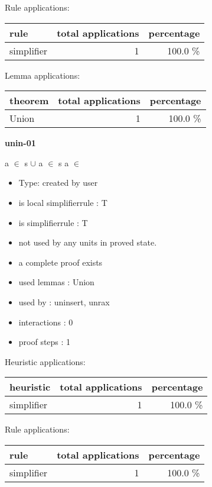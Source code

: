 \documentclass[a4paper]{article}
\begin{document}
Rule applications:

\begin{supertabular}{l|r|r}
rule	        & total applications & percentage \\ \hline
simplifier & 1 & 100.0 \% \\

\end{supertabular}

Lemma applications:

\begin{supertabular}{l|r|r}
theorem	        & total applications & percentage \\ \hline
Union & 1 & 100.0 \% \\

\end{supertabular}
\pagebreak

{\LARGE\bf unin-01}\label{lemma-unin-01}

\medskip

 \Fol \Not a $\in$ s $\cup$  \Equiv \Not a $\in$ s \And \Not a $\in$ 

\begin{itemize}

\item Type: created by user

\item is local simplifierrule : T
\item is simplifierrule : T
\item not used by any units in proved state.
\item       a complete proof exists
\item       used lemmas  : Union
\item       used by      : uninsert, unrax
\item       interactions : 0
\item       proof steps  : 1
\end{itemize}

\medskip


Heuristic applications:

\begin{supertabular}{l|r|r}
heuristic	& total applications & percentage \\ \hline
simplifier & 1 & 100.0 \% \\

\end{supertabular}

Rule applications:

\begin{supertabular}{l|r|r}
rule	        & total applications & percentage \\ \hline
simplifier & 1 & 100.0 \% \\

\end{supertabular}
\end{document}
